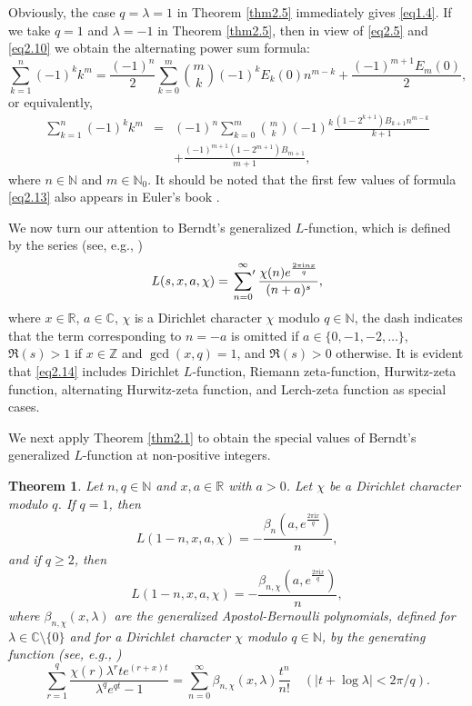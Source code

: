\documentclass[reqno]{amsart}
\numberwithin{equation}{section}
\newtheorem{theorem}[thm]{Theorem}
\begin{document}
Obviously, the case $q=\lambda=1$ in Theorem \ref{thm2.5} immediately gives \eqref{eq1.4}. If we take $q=1$ and $\lambda=-1$ in Theorem \ref{thm2.5}, then in view of \eqref{eq2.5} and \eqref{eq2.10} we obtain the alternating power sum formula:
\begin{equation}\label{eq2.12}
\sum_{k=1}^{n}(-1)^{k}k^{m}=\frac{(-1)^{n}}{2}\sum_{k=0}^{m}\binom{m}{k}(-1)^{k}E_{k}(0)n^{m-k}+\frac{(-1)^{m+1}E_{m}(0)}{2},
\end{equation}
or equivalently,
\begin{eqnarray}\label{eq2.13}
\sum_{k=1}^{n}(-1)^{k}k^{m}&=&(-1)^{n}\sum_{k=0}^{m}\binom{m}{k}(-1)^{k}\frac{(1-2^{k+1})B_{k+1}n^{m-k}}{k+1}\nonumber\\
&&+\frac{(-1)^{m+1}(1-2^{m+1})B_{m+1}}{m+1},
\end{eqnarray}
where $n\in\mathbb{N}$ and $m\in\mathbb{N}_{0}$. It should be noted that the first few values  of formula \eqref{eq2.13} also appears in Euler's book \cite[pp. 499--501]{euler4}.

We now turn our attention to Berndt's generalized $L$-function, which is defined by the series (see, e.g., \cite[p. 430]{berndt3})
\begin{equation}\label{eq2.14}
L(s,x,a,\chi)=\sideset{}{'}\sum_{n=0}^{\infty}\frac{\chi(n)e^{\frac{2\pi \mathrm{i}nx}{q}}}{(n+a)^{s}},
\end{equation}
where $x\in\mathbb{R}$, $a\in\mathbb{C}$, $\chi$ is a Dirichlet character $\chi$ modulo $q\in\mathbb{N}$, the dash indicates that the term corresponding to $n=-a$ is omitted if $a\in\{0,-1,-2,\ldots\}$, $\Re(s)>1$ if $x\in\mathbb{Z}$ and $\gcd(x,q)=1$, and $\Re(s)>0$ otherwise. It is evident that \eqref{eq2.14} includes Dirichlet $L$-function, Riemann zeta-function, Hurwitz-zeta function, alternating Hurwitz-zeta function, and Lerch-zeta function as special cases.

We next apply Theorem \ref{thm2.1} to obtain the special values of Berndt's generalized $L$-function at non-positive integers.

\begin{theorem}\label{thm2.6} Let $n,q\in\mathbb{N}$ and $x,a\in\mathbb{R}$ with $a>0$. Let $\chi$ be a Dirichlet character modulo $q$. If $q=1$, then
\begin{equation}\label{eq2.15}
L(1-n,x,a,\chi)=-\frac{\beta_{n}(a,e^{\frac{2\pi \mathrm{i}x}{q}})}{n},
\end{equation}
and if $q\geqslant2$, then
\begin{equation}\label{eq2.16}
L(1-n,x,a,\chi)=-\frac{\beta_{n,\chi}(a,e^{\frac{2\pi \mathrm{i}x}{q}})}{n},
\end{equation}
where $\beta_{n,\chi}(x,\lambda)$ are the generalized Apostol-Bernoulli polynomials, defined for $\lambda\in\mathbb{C}\setminus\{0\}$ and for a Dirichlet character $\chi$ modulo $q\in\mathbb{N}$, by the generating function (see, e.g., \cite[Definition 2.1]{he})
\begin{equation}\label{eq2.17}
\sum_{r=1}^{q}\frac{\chi(r)\lambda^{r}te^{(r+x)t}}{\lambda^{q}e^{qt}-1}=\sum_{n=0}^{\infty}\beta_{n,\chi}(x,\lambda)\frac{t^{n}}{n!}\quad(|t+\log\lambda|<2\pi/q).
\end{equation}
\end{theorem}
\end{document}
